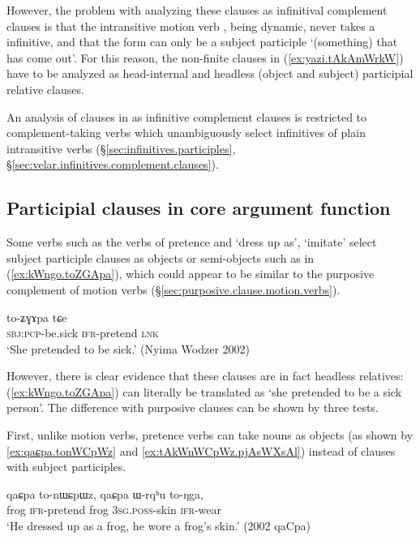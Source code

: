 However, the problem with analyzing these clauses as infinitival complement clauses is that the intransitive  motion verb , being dynamic, never takes a  infinitive, and that the form  can only be a subject participle `(something) that has come out'. For this reason, the non-finite clauses in (\ref{ex:yazi.tAkAmWrkW}) have to be analyzed as head-internal and headless (object and subject) participial relative clauses.

An analysis of clauses in  as infinitive complement clauses is restricted to com\-ple\-ment-taking verbs which unambiguously select  infinitives of plain intransitive verbs (§\ref{sec:infinitives.participles}, §\ref{sec:velar.infinitives.complement.clauses}). 
 
\subsection{Participial clauses in core argument function} \label{sec:relative.pretence}
Some verbs such as the verbs of pretence  and  `dress up as', `imitate' select subject participle clauses as objects or semi-objects such as  in (\ref{ex:kWngo.toZGApa}), which could appear to be similar to the purposive complement of motion verbs (§\ref{sec:purposive.clause.motion.verbs}).

\begin{exe}
\ex \label{ex:kWngo.toZGApa}
\gll  [kɯ-ngo] to-ʑɣɤpa tɕe \\
\textsc{sbj}:\textsc{pcp}-be.sick \textsc{ifr}-pretend \textsc{lnk} \\
\glt `She pretended to be sick.' (Nyima Wodzer 2002)
 \end{exe}

However, there is clear evidence that these clauses are in fact headless relatives: (\ref{ex:kWngo.toZGApa}) can literally be translated as `she pretended to be a sick person'. The difference with purposive clauses can be shown by three tests. 

First, unlike motion verbs, pretence verbs can take nouns as objects (as shown by \ref{ex:qaɕpa.tonWCpWz} and \ref{ex:tAkWnWCpWz.pjAsWXsAl}) instead of clauses with subject participles.  

\begin{exe}
\ex \label{ex:qaɕpa.tonWCpWz}
 \gll  qaɕpa to-nɯɕpɯz, qaɕpa ɯ-rqʰu to-ŋga, \\
frog \textsc{ifr}-pretend frog \textsc{3sg}.\textsc{poss}-skin \textsc{ifr}-wear \\
\glt `He dressed up as a frog, he wore a frog's skin.' (2002 qaCpa)
\end{exe}
 
